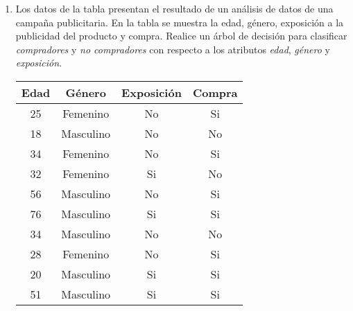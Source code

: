 \documentclass[
10pt, %
a4paper, %
]{article}
\begin{document}
\begin{enumerate}
    \item Los datos de la tabla presentan el resultado de un análisis de datos de una campaña publicitaria. En la tabla se muestra 
	la edad, género, exposición a la publicidad del producto y compra. Realice un árbol de decisión 
	para clasificar \textit{compradores} y \textit{no compradores} con respecto a los atributos \textit{edad}, \textit{género} 
	y \textit{exposición}.
        \begin{table}[H]
            \centering 
            \begin{tabular}{cccc}
                \toprule
                Edad & Género & Exposición & Compra \\ \midrule
                25 & Femenino & No & Si \\
                18 & Masculino & No & No \\
                34 & Femenino & No & Si \\
                32 & Femenino & Si & No \\
                56 & Masculino & No & Si \\
                76 & Masculino & Si & Si \\
                34 & Masculino & No & No \\
                28 & Femenino & No & Si \\
                20 & Masculino & Si & Si \\
                51 & Masculino & Si & Si \\
                \bottomrule
            \end{tabular}
        \end{table}


\end{enumerate}
\end{document}
